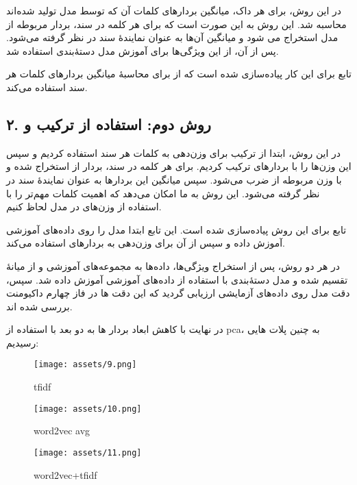 \documentclass[a4paper,12pt]{article}
\begin{document}
	در این روش، برای هر داک، میانگین بردارهای کلمات آن که توسط مدل 
	 تولید شده‌اند محاسبه شد. این روش به این صورت است که برای 
	هر کلمه در سند، بردار مربوطه از مدل  استخراج می ‌شود و 
	میانگین آن‌ها به عنوان نمایندۀ سند در نظر گرفته می‌شود. پس از آن، از این 
	ویژگی‌ها برای آموزش مدل دستۀ‌بندی  استفاده شد.
	
	تابع  برای این کار پیاده‌سازی شده است که از 
	 برای محاسبۀ میانگین بردارهای کلمات هر 
	سند استفاده می‌کند.
	
	\subsection*{۲. روش دوم: استفاده از ترکیب  و }
	
	در این روش، ابتدا از ترکیب  برای وزن‌دهی به کلمات هر سند استفاده کردیم 
	و سپس این وزن‌ها را با بردارهای  ترکیب کردیم. برای هر کلمه 
	در سند، بردار  از استخراج شده و با وزن مربوطه از  
	ضرب می‌شود. سپس میانگین این بردارها به عنوان نمایندۀ سند در نظر گرفته 
	می‌شود. این روش به ما امکان می‌دهد که اهمیت کلمات مهم‌تر را با استفاده از 
	وزن‌های  در مدل  لحاظ کنیم.
	
	تابع  برای این روش پیاده‌سازی شده است. 
	این تابع ابتدا مدل  را روی داده‌های آموزشی آموزش داده و سپس از آن برای وزن‌دهی 
	به بردارهای  استفاده می‌کند.
	
	در هر دو روش، پس از استخراج ویژگی‌ها، داده‌ها به مجموعه‌های آموزشی و از میانۀ 
	تقسیم شده و مدل دستۀ‌بندی  با استفاده از داده‌های آموزشی آموزش داده شد. 
	سپس، دقت مدل روی داده‌های آزمایشی ارزیابی گردید که این دقت ها در فاز چهارم داکیومنت بررسی شده اند.
	
در نهایت با کاهش ابعاد بردار ها به دو بعد با استفاده از pca، به چنین پلات هایی رسیدیم:
 
 	
 \begin{figure}[H]
 	\centering
 	\texttt{[image: assets/9.png]}
 	\caption{\textcolor{CustomAccent}{tfidf}}
 \end{figure}


 \begin{figure}[H]
	\centering
	\texttt{[image: assets/10.png]}
	\caption{\textcolor{CustomAccent}{word2vec avg}}
\end{figure}


 \begin{figure}[H]
	\centering
	\texttt{[image: assets/11.png]}
	\caption{\textcolor{CustomAccent}{word2vec+tfidf}}
\end{figure}
\end{document}
